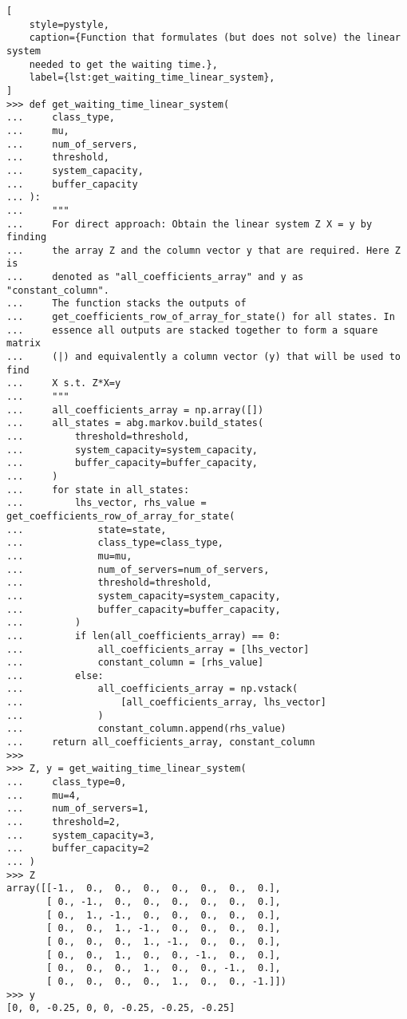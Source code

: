 \begin{lstlisting}[
    style=pystyle,
    caption={Function that formulates (but does not solve) the linear system
    needed to get the waiting time.},
    label={lst:get_waiting_time_linear_system},
]
>>> def get_waiting_time_linear_system(
...     class_type,
...     mu,
...     num_of_servers,
...     threshold,
...     system_capacity,
...     buffer_capacity
... ):
...     """
...     For direct approach: Obtain the linear system Z X = y by finding
...     the array Z and the column vector y that are required. Here Z is
...     denoted as "all_coefficients_array" and y as "constant_column".
...     The function stacks the outputs of
...     get_coefficients_row_of_array_for_state() for all states. In
...     essence all outputs are stacked together to form a square matrix
...     (|) and equivalently a column vector (y) that will be used to find
...     X s.t. Z*X=y
...     """
...     all_coefficients_array = np.array([])
...     all_states = abg.markov.build_states(
...         threshold=threshold,
...         system_capacity=system_capacity,
...         buffer_capacity=buffer_capacity,
...     )
...     for state in all_states:
...         lhs_vector, rhs_value = get_coefficients_row_of_array_for_state(
...             state=state,
...             class_type=class_type,
...             mu=mu,
...             num_of_servers=num_of_servers,
...             threshold=threshold,
...             system_capacity=system_capacity,
...             buffer_capacity=buffer_capacity,
...         )
...         if len(all_coefficients_array) == 0:
...             all_coefficients_array = [lhs_vector]
...             constant_column = [rhs_value]
...         else:
...             all_coefficients_array = np.vstack(
...                 [all_coefficients_array, lhs_vector]
...             )
...             constant_column.append(rhs_value)
...     return all_coefficients_array, constant_column
>>>
>>> Z, y = get_waiting_time_linear_system(
...     class_type=0,
...     mu=4,
...     num_of_servers=1,
...     threshold=2,
...     system_capacity=3,
...     buffer_capacity=2
... )
>>> Z
array([[-1.,  0.,  0.,  0.,  0.,  0.,  0.,  0.],
       [ 0., -1.,  0.,  0.,  0.,  0.,  0.,  0.],
       [ 0.,  1., -1.,  0.,  0.,  0.,  0.,  0.],
       [ 0.,  0.,  1., -1.,  0.,  0.,  0.,  0.],
       [ 0.,  0.,  0.,  1., -1.,  0.,  0.,  0.],
       [ 0.,  0.,  1.,  0.,  0., -1.,  0.,  0.],
       [ 0.,  0.,  0.,  1.,  0.,  0., -1.,  0.],
       [ 0.,  0.,  0.,  0.,  1.,  0.,  0., -1.]])
>>> y
[0, 0, -0.25, 0, 0, -0.25, -0.25, -0.25]

\end{lstlisting}

